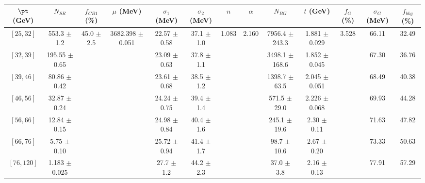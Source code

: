 \begin{tabular}{c||c|c|c|c|c|c|c|c|c|c|c||c}
$\pt$ (GeV) & $N_{SR}$ & $f_{CB1}$ (\%) & $\mu$ (MeV) & $\sigma_1$ (MeV) & $\sigma_2$ (MeV) & $n$ & $\alpha$ & $N_{BG}$ & $t$ (GeV) & $f_G$ (\%) & $\sigma_G$ (MeV) & $f_{bkg}$ (\%) \\
\hline
$[25, 32]$ & 553.3 $\pm$ 1.2 & \multirow{7}{*}{45.0 $\pm$ 2.5} & \multirow{7}{*}{3682.398 $\pm$ 0.051} & 22.57 $\pm$ 0.58 & 37.1 $\pm$ 1.0 & \multirow{7}{*}{1.083} & \multirow{7}{*}{2.160} & 7956.4 $\pm$ 243.3 & 1.881 $\pm$ 0.029 & \multirow{7}{*}{3.528} & 66.11 & 32.49\\
$[32, 39]$ & 195.55 $\pm$ 0.65 &  &  & 23.09 $\pm$ 0.63 & 37.8 $\pm$ 1.1 &  &  & 3498.1 $\pm$ 168.6 & 1.852 $\pm$ 0.045 &  & 67.30 & 36.76\\
$[39, 46]$ & 80.86 $\pm$ 0.42 &  &  & 23.61 $\pm$ 0.68 & 38.5 $\pm$ 1.2 &  &  & 1398.7 $\pm$ 63.5 & 2.045 $\pm$ 0.051 &  & 68.49 & 40.38\\
$[46, 56]$ & 32.87 $\pm$ 0.24 &  &  & 24.24 $\pm$ 0.75 & 39.4 $\pm$ 1.4 &  &  & 571.5 $\pm$ 29.0 & 2.226 $\pm$ 0.068 &  & 69.93 & 44.28\\
$[56, 66]$ & 12.84 $\pm$ 0.15 &  &  & 24.98 $\pm$ 0.84 & 40.4 $\pm$ 1.6 &  &  & 245.1 $\pm$ 19.6 & 2.30 $\pm$ 0.11 &  & 71.63 & 47.82\\
$[66, 76]$ & 5.75 $\pm$ 0.10 &  &  & 25.72 $\pm$ 0.94 & 41.4 $\pm$ 1.7 &  &  & 98.7 $\pm$ 10.6 & 2.67 $\pm$ 0.20 &  & 73.33 & 50.63\\
$[76, 120]$ & 1.183 $\pm$ 0.025 &  &  & 27.7 $\pm$ 1.2 & 44.2 $\pm$ 2.3 &  &  & 37.0 $\pm$ 3.8 & 2.16 $\pm$ 0.13 &  & 77.91 & 57.29\\
\end{tabular}
